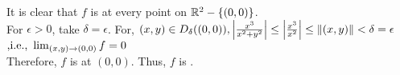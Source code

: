 \begin{soln}{7}
  It is clear that $ f $ is \cts at every point on $ \mathbb{R}^2-\{(0,0)\} $.
  \\ 
  For $ \epsilon >0 $, take $ \delta = \epsilon $. For, $ (x,y) \in D_{\delta}((0,0)), \left| {\frac{x^3}{x^2+y^2}} \right| \leq \left| {\frac{x^3}{x^2}} \right| \le \norm{(x,y)} < \delta = \epsilon $  $  \text{,i.e., } \lim_{(x,y) \to (0,0)} f = 0$ 
  \\ 
  Therefore, $ f $ is \cts at $ (0,0) $. Thus, $ f $ is \cts.
\end{soln}